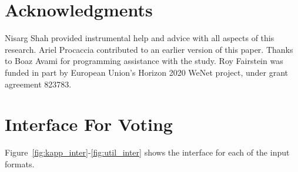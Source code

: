 \documentclass[letterpaper]{article} %
\begin{document}


\section{Acknowledgments}
Nisarg Shah provided instrumental help and advice with all aspects of this research. Ariel Procaccia contributed to an earlier version of this paper. Thanks to Boaz Avami for programming assistance with the study. Roy Fairstein was funded in part by European Union’s Horizon 2020 WeNet project, under grant agreement 823783. 




\clearpage
\appendix
\onecolumn


\section{Interface For Voting}\label{app:interfaces}
Figure~\ref{fig:kapp_inter}-\ref{fig:util_inter} shows   the interface for each of the input formats.
\end{document}
